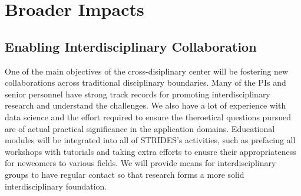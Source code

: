 \documentclass[12pt]{article}
\begin{document}

%
%




\vspace*{-1em}

\section{Broader Impacts}
\label{sec:broaderimpact}

\vspace*{-1em}

\subsection{Enabling Interdisciplinary Collaboration}
One of the main objectives of the cross-disiplinary center will be fostering new collaborations across traditional disciplinary boundaries.  Many of the PIs and senior personnel have strong track records for promoting interdisciplinary research and understand the challenges.  We also have a lot of experience with data science and the effort required to ensure the theroetical questions pursued are of actual practical significance in the application domains.  Educational modules will be integrated into all of STRIDES's activities, such as prefacing all workshops with tutorials and taking extra efforts to enusre their appropriateness for newcomers to various fields.  We will provide means for interdisciplinary groups to have regular contact so that research forms a more solid interdisciplinary foundation.
\end{document}
